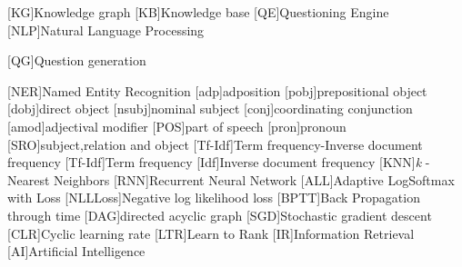 

\begin{acronym}
[KG]{Knowledge graph}
[KB]{Knowledge base}
[QE]{Questioning Engine}
[NLP]{Natural Language Processing}

[QG]{Question generation}

[NER]{Named Entity Recognition}
[adp]{adposition}
[pobj]{prepositional object}
[dobj]{direct object}
[nsubj]{nominal subject}
[conj]{coordinating conjunction}
[amod]{adjectival modifier}
[POS]{part of speech}
[pron]{pronoun}
[SRO]{subject,relation and object}
[Tf-Idf]{Term frequency-Inverse document frequency}
[Tf-Idf]{Term frequency}
[Idf]{Inverse document frequency}
[KNN]{\textit{k} -Nearest Neighbors}
[RNN]{Recurrent Neural Network}
[ALL]{Adaptive LogSoftmax with Loss}
[NLLLoss]{Negative log likelihood loss}
[BPTT]{Back Propagation through time}
[DAG]{directed acyclic graph }
[SGD]{Stochastic gradient descent }
[CLR]{Cyclic learning rate }
[LTR]{Learn to Rank }
[IR]{Information Retrieval }
[AI]{Artificial Intelligence }
\end{acronym}

